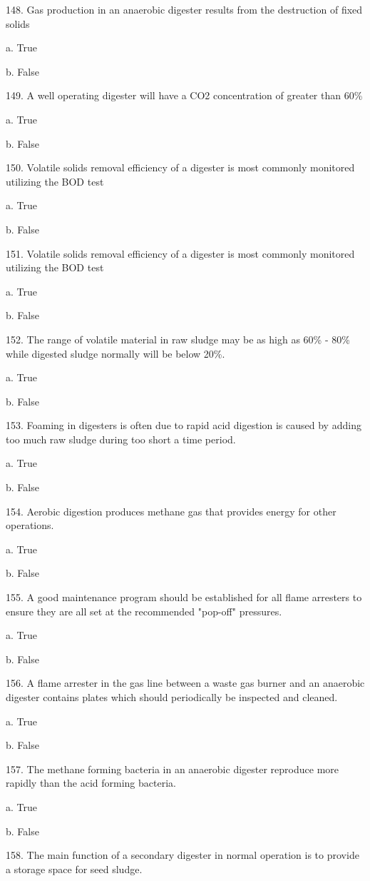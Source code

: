 \documentclass{article}
\begin{document}
148. Gas production in an anaerobic digester results from the destruction of fixed solids 

a. True 

b. False 


149. A well operating digester will have a CO2 concentration of greater than 60\% 

a. True 

b. False 


150. Volatile solids removal efficiency of a digester is most commonly monitored utilizing the BOD test

a. True 

b. False 


151. Volatile solids removal efficiency of a digester is most commonly monitored utilizing the BOD test

a. True 

b. False 


152. The range of volatile material in raw sludge may be as high as 60\% - 80\% while digested sludge normally will be below 20\%. 

a. True 

b. False 


153. Foaming in digesters is often due to rapid acid digestion is caused by adding too much raw sludge during too short a time period. 

a. True 

b. False 


154. Aerobic digestion produces methane gas that provides energy for other operations. 

a. True 

b. False 


155. A good maintenance program should be established for all flame arresters to ensure they are all set at the recommended "pop-off" pressures. 

a. True 

b. False 


156. A flame arrester in the gas line between a waste gas burner and an anaerobic digester contains plates which should periodically be inspected and cleaned. 

a. True 

b. False 


157. The methane forming bacteria in an anaerobic digester reproduce more rapidly than the acid forming bacteria. 

a. True 

b. False 


158. The main function of a secondary digester in normal operation is to provide a storage space for seed sludge. 
\end{document}
